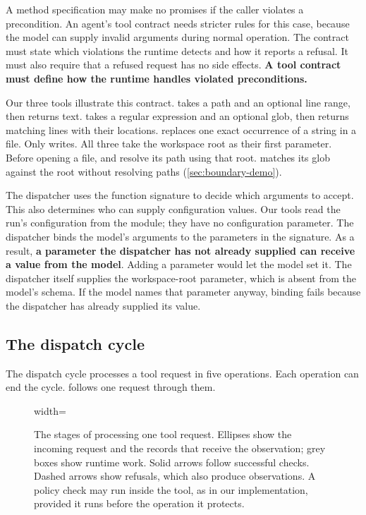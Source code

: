 A method specification may make no promises if the caller violates a precondition. An agent's
tool contract needs stricter rules for this case, because the model can supply invalid arguments
during normal operation. The contract must state which violations the runtime detects and how
it reports a refusal. It must also require that a refused request has no side effects.
\textbf{A tool contract must define how the runtime handles violated preconditions.}

Our three tools illustrate this contract.  takes a path and an optional line
range, then returns text.  takes a regular expression and an optional glob, then
returns matching lines with their locations.  replaces one exact occurrence of a
string in a file. Only  writes. All three take the workspace root as their first
parameter. Before opening a file,  and  resolve its path using
that root.  matches its glob against the root without resolving paths
(\cref{sec:boundary-demo}).

The dispatcher uses the function signature to decide which arguments to accept. This also
determines who can supply configuration values. Our tools read the run's configuration from the
module; they have no configuration parameter. The dispatcher binds the model's arguments to the
parameters in the signature. As a result, \textbf{a parameter the dispatcher has not already
supplied can receive a value from the model}. Adding a  parameter would let the
model set it. The dispatcher itself supplies the workspace-root parameter, which is absent from
the model's schema. If the model names that parameter anyway, binding fails because the
dispatcher has already supplied its value.

\subsection{The dispatch cycle}
\label{sec:boundary-dispatch}

The dispatch cycle processes a tool request in five operations. Each operation can end the cycle.
 follows one request through them.

\begin{figure}[htbp]
  \centering
  \begin{adjustbox}{width=\linewidth}\end{adjustbox}
  \caption{The stages of processing one tool request. Ellipses show the incoming request and the records
  that receive the observation; grey boxes show runtime work. Solid arrows follow successful
  checks. Dashed arrows show refusals, which also produce observations. A policy check may run
  inside the tool, as in our implementation, provided it runs before the operation it protects.}
  \label{fig:dispatch-cycle}
\end{figure}

